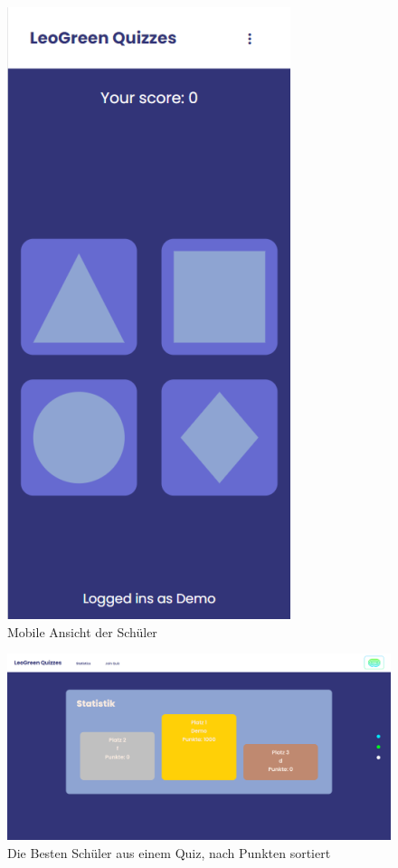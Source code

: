\begin{figure}
    \centering
    \includegraphics[scale=0.4]{pics/image (9).png}
    \caption{Mobile Ansicht der Schüler }
    \label{fig:impl:img10}
\end{figure}
\begin{figure}
    \centering
    \includegraphics[scale=0.3]{pics/image (10).png}
    \caption{Die Besten Schüler aus einem Quiz, nach Punkten sortiert}
    \label{fig:impl:img11}
\end{figure}

